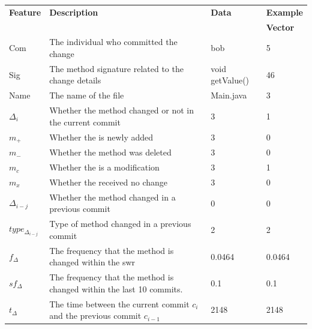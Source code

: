 \begin{table}
\begin{center}
    \begin{tabularx}{\linewidth}{|l|X|l|l|}
        \hline
        \textbf{Feature} & \textbf{Description} & \textbf{Data} & \textbf{Example} \\
         & & & \textbf{Vector} \\
        \hline
        Com & The individual who committed the change & bob & 5 \\ \hline
        Sig & The method signature related to the change details & void getValue() & 46\\ \hline
        Name & The name of the file & Main.java & 3 \\ \hline
        $\Delta_i$ & Whether the method changed or not in the current commit & 3 & 1 \\ \hline 

        $m_+$ & Whether the is newly added & 3 & 0 \\ \hline
        $m_-$ & Whether the method was deleted & 3 & 0 \\ \hline
        $m_c$ & Whether the is a modification & 3 & 1 \\ \hline
        $m_x$ & Whether the received no change & 3 & 0 \\ \hline

        $\Delta_{i-j}$ & Whether the method changed in a previous commit & 0 & 0 \\ \hline

        $type_{\Delta_{i-j}}$ & Type of method changed in a previous commit & 2 & 2 \\ \hline
        
        $f_{\Delta}$ & The frequency that the method is changed within the \gls{swr} & 0.0464 & 0.0464 \\ \hline
        $sf_{\Delta}$ & The frequency that the method is changed within the last 10 commits.  & 0.1 & 0.1 \\ \hline
        $t_\Delta$ & The time between the current commit $c_i$ and the previous commit $c_{i-1}$ & 2148 & 2148 \\ \hline


\end{tabularx}
\end{center}
\end{table}
